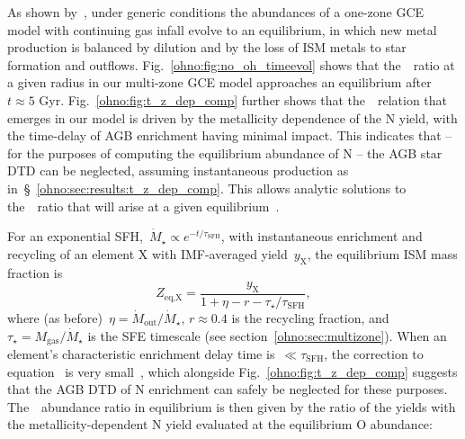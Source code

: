 As shown by~\citet{Weinberg2017b}, under generic conditions the abundances of a
one-zone GCE model with continuing gas infall evolve to an equilibrium, in
which new metal production is balanced by dilution and by the loss of ISM
metals to star formation and outflows.
Fig.~\ref{ohno:fig:no_oh_timeevol} shows that the~\no~ratio at a given radius in our
multi-zone GCE model approaches an equilibrium after~$t \approx 5$ Gyr.
Fig.~\ref{ohno:fig:t_z_dep_comp} further shows that the~\ohno~relation that emerges
in our model is driven by the metallicity dependence of the N yield, with the
time-delay of AGB enrichment having minimal impact.
This indicates that -- for the purposes of computing the equilibrium abundance
of N -- the AGB star DTD can be neglected, assuming instantaneous production as
in~\S~\ref{ohno:sec:results:t_z_dep_comp}.
This allows analytic solutions to the~\no~ratio that will arise at a
given equilibrium~\oh.
\par
For an exponential SFH,~$\dot{M}_\star \propto e^{-t/\tau_\text{SFH}}$, with
instantaneous enrichment and recycling of an element X with IMF-averaged
yield~$y_\text{X}$, the equilibrium ISM mass fraction is
\begin{equation}
Z_\text{eq,X} = \frac{y_\text{X}}{1 + \eta - r - \tau_\star/\tau_\text{SFH}},
\label{ohno:eq:zeq}
\end{equation} 
where (as before)~$\eta = \dot{M}_\text{out} / \dot{M}_\star$, $r \approx 0.4$
is the recycling fraction, and~$\tau_\star = M_\text{gas} / \dot{M}_\star$ is
the SFE timescale (see section~\ref{ohno:sec:multizone}).
When an element's characteristic enrichment delay time is~$\ll \tau_\text{SFH}$,
the correction to equation~ is very small~\citep{Weinberg2017b},
which alongside Fig.~\ref{ohno:fig:t_z_dep_comp} suggests that the AGB DTD of N
enrichment can safely be neglected for these purposes.
The~\no~abundance ratio in equilibrium is then given by the ratio of the yields
with the metallicity-dependent N yield evaluated at the equilibrium O abundance:

